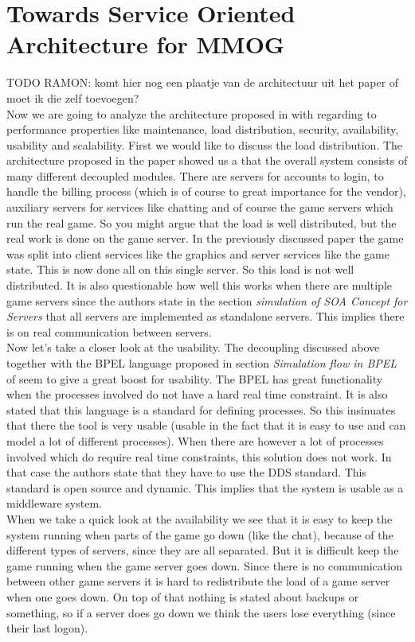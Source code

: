 \section*{Towards Service Oriented Architecture for MMOG}
TODO RAMON: komt hier nog een plaatje van de architectuur uit het paper of moet ik die zelf toevoegen?\\


\noindent Now we are going to analyze the architecture proposed in \cite{service} with regarding to performance properties like maintenance, load distribution, security, availability, usability and scalability. First we would like to discuss the load distribution. The architecture proposed in the paper showed us a that the overall system consists of many different decoupled modules. There are servers for accounts to login, to handle the billing process (which is of course to great importance for the vendor), auxiliary servers for services like chatting and of course the game servers which run the real game. So you might argue that the load is well distributed, but the real work is done on the game server. In the previously discussed paper the game was split into client services like the graphics and server services like the game state. This is now done all on this single server. So this load is not well distributed. It is also questionable how well this works when there are multiple game servers since the authors state in the section \emph{simulation of SOA Concept for Servers} that all servers are implemented as standalone servers. This implies there is on real communication between servers. \\
\indent Now let’s take a closer look at the usability. The decoupling discussed above together with the BPEL language proposed in section \emph{Simulation flow in BPEL} of \cite{service} seem to give a great boost for usability. The BPEL has great functionality when the processes involved do not have a hard real time constraint. It is also stated that this language is a standard for defining processes. So this insinuates that there the tool is very usable (usable in the fact that it is easy to use and can model a lot of different processes). When there are however a lot of processes involved which do require real time constraints, this solution does not work. In that case the authors state that they have to use the DDS standard. This standard is open source and dynamic. This implies that the system is usable as a middleware system.\\
\indent When we take a quick look at the availability we see that it is easy to keep the system running when parts of the game go down (like the chat), because of the different types of servers, since they are all separated. But it is difficult keep the game running when the game server goes down. Since there is no communication between other game servers it is hard to redistribute the load of a game server when one goes down. On top of that nothing is stated about backups or something, so if a server does go down we think the users lose everything (since their last logon). \\
